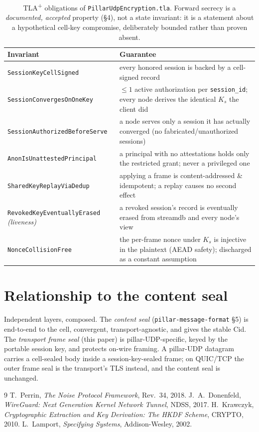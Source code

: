 \documentclass[10pt,twocolumn]{article}
\newcommand{\code}[1]{\texttt{\small #1}}
\newcommand{\Ks}{\ensuremath{K_s}}
\begin{document}
\begin{table}[t]
\footnotesize
\setlength{\tabcolsep}{4pt}
\begin{tabular}{@{}p{}p{}@{}}
\toprule
\textbf{Invariant} & \textbf{Guarantee} \\
\midrule
\code{SessionKey\-CellSigned} & every honored session is backed by a cell-signed record \\
\code{SessionConvergesOn\-OneKey} & $\le 1$ active authorization per \code{session\_id}; every node derives the identical \Ks{} the client did \\
\code{SessionAuthorized\-BeforeServe} & a node serves only a session it has actually converged (no fabricated/unauthorized sessions) \\
\code{AnonIsUnattested\-Principal} & a principal with no attestations holds only the restricted grant; never a privileged one \\
\code{SharedKeyReplay\-ViaDedup} & applying a frame is content-addressed \& idempotent; a replay causes no second effect \\
\code{RevokedKeyEventual\-lyErased} \emph{(liveness)} & a revoked session's record is eventually erased from streamdb and every node's view \\
\code{NonceCollisionFree} & the per-frame nonce under \Ks{} is injective in the plaintext (AEAD safety); discharged as a constant assumption \\
\bottomrule
\end{tabular}
\caption{TLA\textsuperscript{+} obligations of \code{PillarUdpEncryption.tla}.
Forward secrecy is a \emph{documented, accepted} property (\S4), not a state
invariant: it is a statement about a hypothetical cell-key compromise,
deliberately bounded rather than proven absent.}
\label{tab:inv}
\end{table}

\clearpage
\section{Relationship to the content seal}
Independent layers, composed. The \emph{content seal} (\code{pillar-message-format}
\S5) is end-to-end to the cell, convergent, transport-agnostic, and gives the
stable Cid. The \emph{transport frame seal} (this paper) is pillar-UDP-specific,
keyed by the portable session key, and protects on-wire framing. A pillar-UDP
datagram carries a cell-sealed body inside a session-key-sealed frame; on QUIC/TCP
the outer frame seal is the transport's TLS instead, and the content seal is
unchanged.

\begin{thebibliography}{9}
 T.~Perrin, \emph{The Noise Protocol Framework}, Rev.~34, 2018.
 J.~A.~Donenfeld, \emph{WireGuard: Next Generation Kernel
  Network Tunnel}, NDSS, 2017.
 H.~Krawczyk, \emph{Cryptographic Extraction and Key Derivation:
  The HKDF Scheme}, CRYPTO, 2010.
 L.~Lamport, \emph{Specifying Systems}, Addison-Wesley, 2002.
\end{thebibliography}
\end{document}
